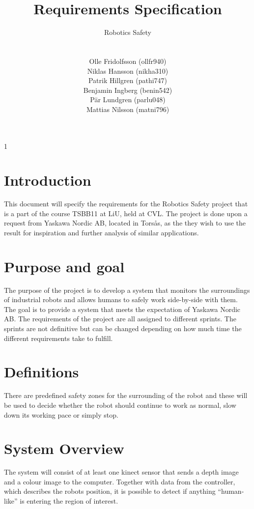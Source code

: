 1\documentclass[10pt,a4paper]{article}
\title{Requirements Specification}
\author{\begin{large}{Robotics Safety}\end{large}\\\\
Olle Fridolfsson (ollfr940) \\  Niklas Hansson (nikha310) \\ Patrik Hillgren (pathi747) \\ Benjamin Ingberg (benin542)\\ Pär Lundgren (parlu048) \\ Mattias Nilsson (matni796)}
\begin{document}
\maketitle
\newpage
\tableofcontents
\newpage
\noindent %
\section{Introduction}
This document will specify the requirements for the Robotics Safety project that is a part of the course TSBB11 at LiU, held at CVL. The project is done upon a request from Yaskawa Nordic AB, located in Torsås, as the they wish to use the result for inspiration and further analysis of similar applications.
\section{Purpose and goal}
The purpose of the project is to develop a system that monitors the surroundings of industrial robots and allows humans to safely work side-by-side with them. 
The goal is to provide a system that meets the expectation of Yaskawa Nordic AB.
The requirements of the project are all assigned to different sprints. The sprints are not definitive but can be changed depending on how much time the different requirements take to fulfill. 

\section{Definitions}
There are predefined safety zones for the surrounding of the robot and these will be used to decide whether the robot should continue to work as normal, slow down its working pace or simply stop.

\section{System Overview}
The system will consist of at least one kinect sensor that sends a depth image and a colour image to the computer. Together with data from the controller, which describes the robots position, it is possible to detect if anything “human-like” is entering the region of interest.
\end{document}
